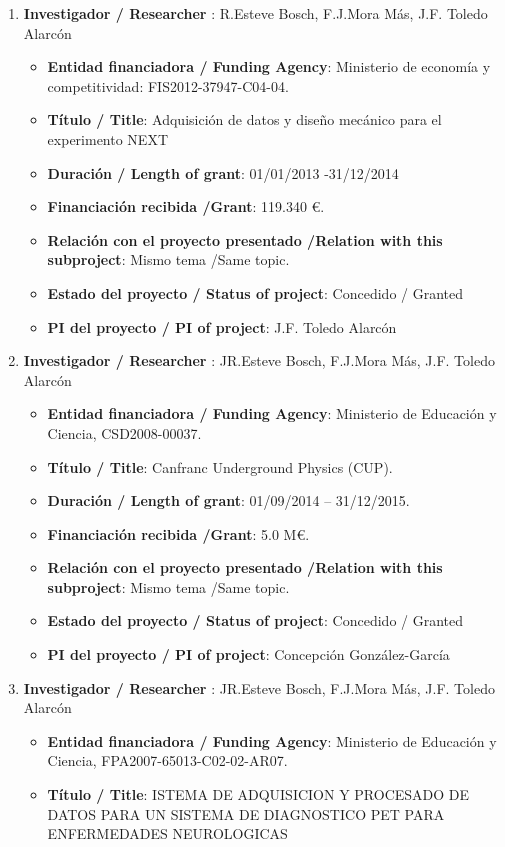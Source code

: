 \begin{enumerate}
\item {\bf Investigador / Researcher }: R.Esteve Bosch, F.J.Mora Más, J.F. Toledo Alarcón
\begin{itemize}
\item {\bf Entidad financiadora / Funding Agency}: Ministerio de economía y competitividad: FIS2012-37947-C04-04.
\item {\bf Título / Title}:  Adquisición de datos y diseño mecánico para el experimento NEXT
\item {\bf Duración / Length of grant}: 01/01/2013 -31/12/2014
\item {\bf Financiación recibida /Grant}: 119.340 \euro. 
\item {\bf Relación con el proyecto presentado /Relation with this subproject}: Mismo tema /Same topic. 
\item {\bf Estado del proyecto / Status of project}: Concedido / Granted
\item {\bf PI del proyecto / PI of project}: J.F. Toledo Alarcón
\end{itemize}
\item {\bf Investigador / Researcher }: JR.Esteve Bosch, F.J.Mora Más, J.F. Toledo Alarcón
\begin{itemize}
\item {\bf Entidad financiadora / Funding Agency}: Ministerio de Educaci\'on y Ciencia, CSD2008-00037.
\item {\bf Título / Title}:  Canfranc Underground Physics (CUP).
\item {\bf Duración / Length of grant}: 01/09/2014 -- 31/12/2015. 
\item {\bf Financiación recibida /Grant}: 5.0 M\euro. 
\item {\bf Relación con el proyecto presentado /Relation with this subproject}: Mismo tema /Same topic. 
\item {\bf Estado del proyecto / Status of project}: Concedido / Granted
\item {\bf PI del proyecto / PI of project}: Concepción González-García 
\end{itemize}
\item {\bf Investigador / Researcher }: JR.Esteve Bosch, F.J.Mora Más, J.F. Toledo Alarcón
\begin{itemize}
\item {\bf Entidad financiadora / Funding Agency}: Ministerio de Educaci\'on y Ciencia, FPA2007-65013-C02-02-AR07.
\item {\bf Título / Title}:  ISTEMA DE ADQUISICION Y PROCESADO DE DATOS PARA UN SISTEMA DE DIAGNOSTICO PET PARA ENFERMEDADES NEUROLOGICAS

\end{itemize}
\end{enumerate}
